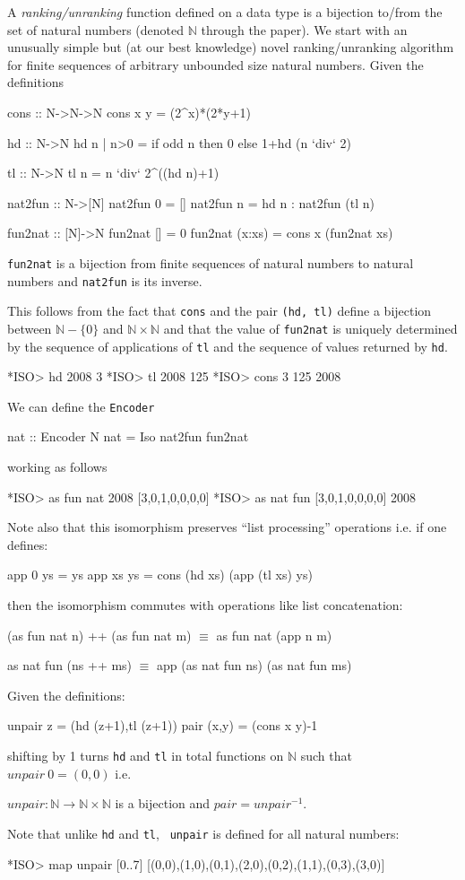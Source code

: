 \documentclass[]{INCLUDES/llncs}
\begin{document}
A {\em ranking/unranking} function defined on a data type is a bijection to/from
the set of natural numbers (denoted $\mathbb{N}$ through the paper). 
We start with an unusually simple but (at our best knowledge) novel
ranking/unranking algorithm for finite sequences of arbitrary 
unbounded size natural numbers. Given the definitions
\begin{code}
cons :: N->N->N
cons x y  = (2^x)*(2*y+1)

hd :: N->N
hd n | n>0 = if odd n then 0 else 1+hd  (n `div` 2)

tl :: N->N
tl n = n `div` 2^((hd n)+1)

nat2fun :: N->[N]
nat2fun 0 = []
nat2fun n = hd n : nat2fun (tl n)
 
fun2nat :: [N]->N  
fun2nat [] = 0
fun2nat (x:xs) = cons x (fun2nat xs)
\end{code}
\begin{prop}
{\tt fun2nat} is a bijection from finite sequences of natural numbers to natural
numbers and {\tt nat2fun} is its inverse.
\end{prop}
This follows from the fact that {\tt cons} and the pair {\tt (hd, tl)} define a bijection between
$\mathbb{N}-\{0\}$ and $\mathbb{N} \times \mathbb{N}$ and that the value of {\tt fun2nat} is uniquely
determined by the sequence of applications of {\tt tl} and the sequence of
values returned by {\tt hd}.
\begin{codex}
*ISO> hd 2008
3
*ISO> tl 2008
125
*ISO> cons 3 125
2008
\end{codex}
We can define the {\tt Encoder}
\begin{code}
nat :: Encoder N
nat = Iso nat2fun fun2nat
\end{code}
working as follows
\begin{codex}
*ISO> as fun nat 2008
[3,0,1,0,0,0,0]
*ISO> as nat fun [3,0,1,0,0,0,0]
2008
\end{codex}
Note also that this isomorphism preserves ``list processing'' operations i.e.
if one defines:
\begin{code}
app 0 ys = ys
app xs ys = cons (hd xs) (app (tl xs) ys)
\end{code}
then the isomorphism commutes with operations like list concatenation:
\begin{prop}
(as fun nat n) ++ (as fun nat m) $\equiv$ as fun nat (app n m)

as nat fun (ns ++ ms) $\equiv$ app (as nat fun ns) (as nat fun ms)
\end{prop}
Given the definitions:
\begin{code}
unpair z = (hd (z+1),tl (z+1))
pair (x,y) = (cons x y)-1
\end{code}
shifting by 1 turns {\tt hd} and {\tt tl} in
total functions on $\mathbb{N}$ such that $unpair~0=(0,0)$ i.e.
\begin{prop}
$unpair:\mathbb{N} \rightarrow \mathbb{N} \times \mathbb{N}$ 
is a bijection and $pair=unpair^{-1}$.
\end{prop}
Note that unlike {\tt hd} and {\tt tl}, {\tt
unpair} is defined for all natural numbers:
\begin{codex}
*ISO> map unpair [0..7]
[(0,0),(1,0),(0,1),(2,0),(0,2),(1,1),(0,3),(3,0)]
\end{codex}
\end{document}
